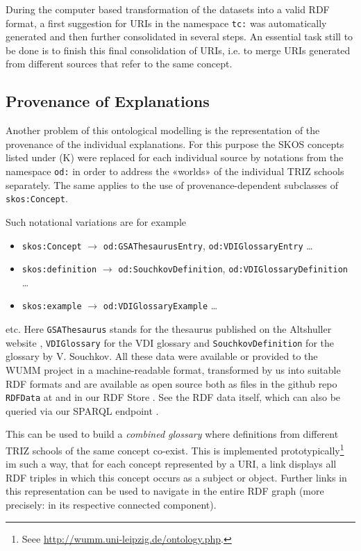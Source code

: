 \documentclass[11pt,a4paper]{article}
\begin{document}
During the computer based transformation of the datasets into a valid RDF
format, a first suggestion for URIs in the namespace \texttt{tc:} was
automatically generated and then further consolidated in several steps. An
essential task still to be done is to finish this final consolidation of URIs,
i.e. to merge URIs generated from different sources that refer to the same
concept.

\subsection{Provenance of Explanations}

Another problem of this ontological modelling is the representation of the
provenance of the individual explanations. For this purpose the SKOS concepts
listed under (K) were replaced for each individual source by notations from
the namespace \texttt{od:} in order to address the «worlds» of the individual
TRIZ schools separately.  The same applies to the use of provenance-dependent
subclasses of \texttt{skos:Concept}.

Such notational variations are for example
\begin{itemize}[noitemsep]
\item \texttt{skos:Concept} $\to$ \texttt{od:GSAThesaurusEntry},
  \texttt{od:VDIGlossaryEntry} \ldots
\item \texttt{skos:definition} $\to$ \texttt{od:SouchkovDefinition},
  \texttt{od:VDIGlossaryDefinition} \ldots
\item \texttt{skos:example} $\to$ \texttt{od:VDIGlossaryExample} \ldots
\end{itemize}
etc.  Here \texttt{GSAThesaurus} stands for the thesaurus published on the
Altshuller website \cite{GSA}, \texttt{VDIGlossary} for the VDI glossary
\cite{VDI} and \texttt{SouchkovDefinition} for the glossary
\cite{Souchkov2018} by V. Souchkov. All these data were available or provided
to the WUMM project in a machine-readable format, transformed by us into
suitable RDF formats and are available as open source both as files in the
github repo \texttt{RDFData} at \cite{WUMM-github} and in our RDF Store
\cite{WUMM-store}. See the RDF data itself, which can also be queried via our
SPARQL endpoint \cite{WUMM-sparql}.

This can be used to build a \emph{combined glossary} where definitions from
different TRIZ schools of the same concept co-exist. This is implemented
prototypically\footnote{Seee \url{http://wumm.uni-leipzig.de/ontology.php}.}
im such a way, that for each concept represented by a URI, a link displays all
RDF triples in which this concept occurs as a subject or object. Further links
in this representation can be used to navigate in the entire RDF graph (more
precisely: in its respective connected component).
\end{document}
